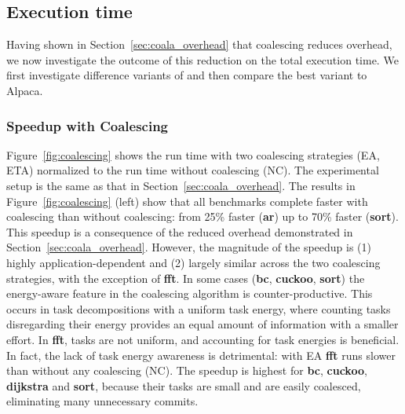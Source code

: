 \subsection{Execution time}
\label{sec:result_coalescing}

Having shown in Section~\ref{sec:coala_overhead} that coalescing reduces
overhead, we now investigate the outcome of this reduction on the total
execution time. We first investigate difference variants of \sys and
then compare the best variant to Alpaca.


\subsubsection{\sys Speedup with Coalescing}

Figure~\ref{fig:coalescing} shows the \sys run time with two coalescing
strategies (EA, ETA) normalized to the run time without coalescing (NC).
%
The experimental setup is the same as that in Section~\ref{sec:coala_overhead}.
%
The results in Figure~\ref{fig:coalescing} (left) show that all benchmarks
complete faster with coalescing than without coalescing: from 25\% faster
(\textbf{ar}) up to 70\% faster (\textbf{sort}).
%
This speedup is a consequence of the reduced overhead demonstrated in
Section~\ref{sec:coala_overhead}.
%
However, the magnitude of the speedup is (1) highly application-dependent and
(2) largely similar across the two coalescing strategies, with the exception of
\textbf{fft}.
%
In some cases (\textbf{bc}, \textbf{cuckoo}, \textbf{sort}) the energy-aware
feature in the coalescing algorithm is counter-productive.
%
This occurs in task decompositions with a uniform task energy, where counting
tasks disregarding their energy provides an equal amount of information with a
smaller effort.
%
In \textbf{fft}, tasks are not uniform, and accounting for task energies is
beneficial. In fact, the lack of task energy awareness is detrimental: with EA
\textbf{fft} runs slower than without any coalescing (NC).
%
The speedup is highest for \textbf{bc}, \textbf{cuckoo}, \textbf{dijkstra} and
\textbf{sort}, because their tasks are small and are easily coalesced,
eliminating many unnecessary commits.

